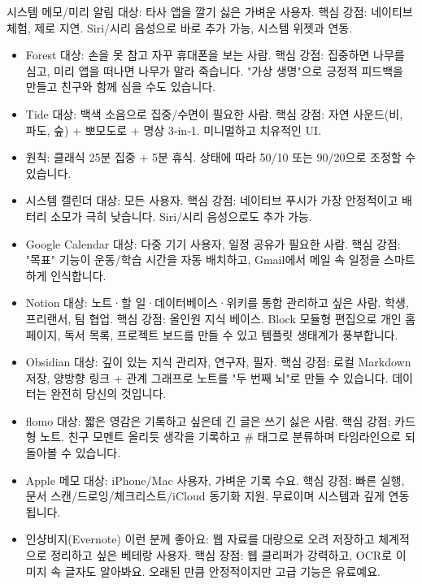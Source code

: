 시스템 메모/미리 알림 대상: 타사 앱을 깔기 싫은 가벼운 사용자. 핵심 강점: 네이티브 체험, 제로 지연. Siri/시리 음성으로 바로 추가 가능, 시스템 위젯과 연동.


\begin{itemize}
  \item Forest 대상: 손을 못 참고 자꾸 휴대폰을 보는 사람. 핵심 강점: 집중하면 나무를 심고, 미리 앱을 떠나면 나무가 말라 죽습니다. "가상 생명"으로 긍정적 피드백을 만들고 친구와 함께 심을 수도 있습니다.
  \item Tide 대상: 백색 소음으로 집중/수면이 필요한 사람. 핵심 강점: 자연 사운드(비, 파도, 숲) + 뽀모도로 + 명상 3-in-1. 미니멀하고 치유적인 UI.
  \item 원칙: 클래식 25분 집중 + 5분 휴식. 상태에 따라 50/10 또는 90/20으로 조정할 수 있습니다.
\end{itemize}


\begin{itemize}
  \item 시스템 캘린더 대상: 모든 사용자. 핵심 강점: 네이티브 푸시가 가장 안정적이고 배터리 소모가 극히 낮습니다. Siri/시리 음성으로도 추가 가능.
  \item Google Calendar 대상: 다중 기기 사용자, 일정 공유가 필요한 사람. 핵심 강점: "목표" 기능이 운동/학습 시간을 자동 배치하고, Gmail에서 메일 속 일정을 스마트하게 인식합니다.
\end{itemize}


\begin{itemize}
  \item Notion 대상: 노트·할 일·데이터베이스·위키를 통합 관리하고 싶은 사람. 학생, 프리랜서, 팀 협업. 핵심 강점: 올인원 지식 베이스. Block 모듈형 편집으로 개인 홈페이지, 독서 목록, 프로젝트 보드를 만들 수 있고 템플릿 생태계가 풍부합니다.
  \item Obsidian 대상: 깊이 있는 지식 관리자, 연구자, 필자. 핵심 강점: 로컬 Markdown 저장, 양방향 링크 + 관계 그래프로 노트를 "두 번째 뇌"로 만들 수 있습니다. 데이터는 완전히 당신의 것입니다.
  \item flomo 대상: 짧은 영감은 기록하고 싶은데 긴 글은 쓰기 싫은 사람. 핵심 강점: 카드형 노트. 친구 모멘트 올리듯 생각을 기록하고 \# 태그로 분류하며 타임라인으로 되돌아볼 수 있습니다.
  \item Apple 메모 대상: iPhone/Mac 사용자, 가벼운 기록 수요. 핵심 강점: 빠른 실행, 문서 스캔/드로잉/체크리스트/iCloud 동기화 지원. 무료이며 시스템과 깊게 연동됩니다.
  \item 인샹비지(Evernote) 이런 분께 좋아요: 웹 자료를 대량으로 오려 저장하고 체계적으로 정리하고 싶은 베테랑 사용자. 핵심 장점: 웹 클리퍼가 강력하고, OCR로 이미지 속 글자도 알아봐요. 오래된 만큼 안정적이지만 고급 기능은 유료예요.
\end{itemize}


